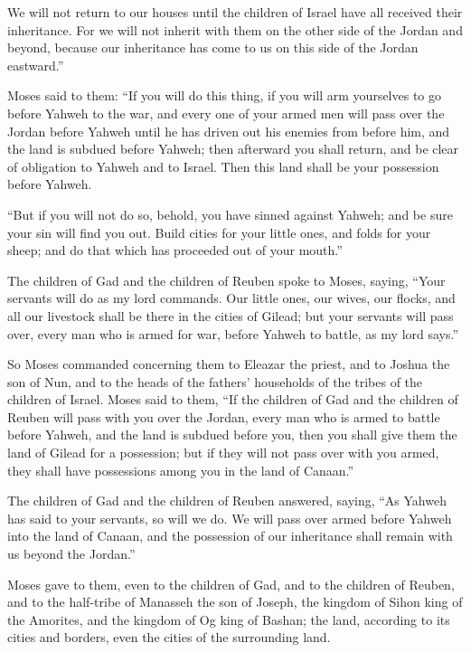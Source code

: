 {We will not return to our houses until the children of Israel have all received their inheritance.
For we will not inherit with them on the other side of the Jordan and beyond, because our inheritance has come to us on this side of the Jordan eastward.”
\par }{\PP {}Moses said to them: “If you will do this thing, if you will arm yourselves to go before Yahweh to the war,
and every one of your armed men will pass over the Jordan before Yahweh until he has driven out his enemies from before him,
and the land is subdued before Yahweh; then afterward you shall return, and be clear of obligation to Yahweh and to Israel. Then this land shall be your possession before Yahweh.
\par }{\PP {}“But if you will not do so, behold, you have sinned against Yahweh; and be sure your sin will find you out.
Build cities for your little ones, and folds for your sheep; and do that which has proceeded out of your mouth.”
\par }{\PP {}The children of Gad and the children of Reuben spoke to Moses, saying, “Your servants will do as my lord commands.
Our little ones, our wives, our flocks, and all our livestock shall be there in the cities of Gilead;
but your servants will pass over, every man who is armed for war, before Yahweh to battle, as my lord says.”
\par }{\PP {}So Moses commanded concerning them to Eleazar the priest, and to Joshua the son of Nun, and to the heads of the fathers’ households of the tribes of the children of Israel.
Moses said to them, “If the children of Gad and the children of Reuben will pass with you over the Jordan, every man who is armed to battle before Yahweh, and the land is subdued before you, then you shall give them the land of Gilead for a possession;
but if they will not pass over with you armed, they shall have possessions among you in the land of Canaan.”
\par }{\PP {}The children of Gad and the children of Reuben answered, saying, “As Yahweh has said to your servants, so will we do.
We will pass over armed before Yahweh into the land of Canaan, and the possession of our inheritance shall remain with us beyond the Jordan.”
\par }{\PP {}Moses gave to them, even to the children of Gad, and to the children of Reuben, and to the half-tribe of Manasseh the son of Joseph, the kingdom of Sihon king of the Amorites, and the kingdom of Og king of Bashan; the land, according to its cities and borders, even the cities of the surrounding land.
}

